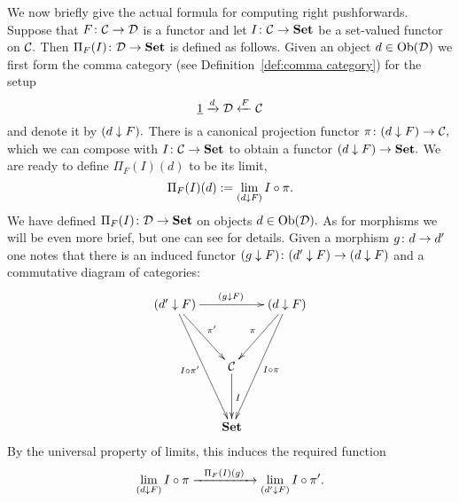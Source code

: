 \documentclass[../main/CT4S-EN-RU]{subfiles}
\begin{document}
\begin{blockENG}
We now briefly give the actual formula for computing right pushforwards. Suppose that $F\colon\mathcal{C}\rightarrow\mathcal{D}$ is a functor and let $I\colon\mathcal{C}\rightarrow{\mathbf{Set}}$ be a set-valued functor on $\mathcal{C}.$ Then $\Pi_F(I)\colon\mathcal{D}\rightarrow{\mathbf{Set}}$ is defined as follows. Given an object $d\in\operatorname{Ob}(\mathcal{D})$ we first form the comma category (see Definition~\ref{def:comma category}) for the setup
$$\underline{1}\xrightarrow{d}\mathcal{D}\xleftarrow{F}\mathcal{C}$$
and denote it by $(d\downarrow F).$ There is a canonical projection functor $\pi\colon(d\downarrow F)\rightarrow\mathcal{C},$ which we can compose with $I\colon\mathcal{C}\rightarrow{\mathbf{Set}}$ to obtain a functor $(d\downarrow F)\rightarrow{\mathbf{Set}}.$ We are ready to define $\Pi_F(I)(d)$ to be its limit,
$$\Pi_F(I)(d):=\lim_{(d\downarrow F)}I\circ\pi.$$
We have defined $\Pi_F(I)\colon\mathcal{D}\rightarrow{\mathbf{Set}}$ on objects $d\in\operatorname{Ob}(\mathcal{D}).$ As for morphisms we will be even more brief, but one can see \cite{Sp1} for details. Given a morphism $g\colon d\rightarrow d'$ one notes that there is an induced functor $(g\downarrow F)\colon (d'\downarrow F)\rightarrow(d\downarrow F)$ and a commutative diagram of categories:
$$
\xymatrix@=15pt{
(d'\down F)\ar[rr]^{(g\down F)}\ar[ddr]^{\pi'}\ar[ddddr]_{I\circ\pi'}&&(d\down F)\ar[ddl]_{\pi}\ar[ddddl]^{I\circ\pi}\\\\
&\mcC\ar[dd]^I\\\\
&\Set
}
$$
By the universal property of limits, this induces the required function $$\lim_{(d\downarrow F)}I\circ\pi\xrightarrow{\ \ \Pi_F(I)(g)\ \ }\lim_{(d'\downarrow F)}I\circ\pi'.$$
\end{blockENG}

\begin{blockRUS}
\end{blockRUS}
\end{document}
